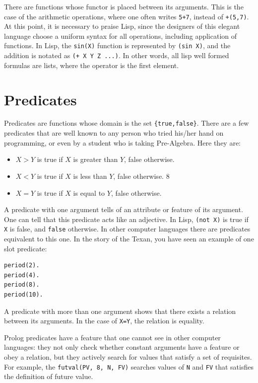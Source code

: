 \documentclass[a4paper,12pt]{book}
\begin{document}
There are functions whose functor is placed between
its arguments. This is the case of the arithmetic
operations, where one often writes \verb|5+7|, instead
of \verb|+(5,7)|. At this point, it is necessary to
praise Lisp, since the designers of this elegant language
choose a uniform syntax for all operations, including
application of functions. In Lisp, the \verb|sin(X)|
function is represented by \verb|(sin X)|, and the
addition is notated as \verb|(+ X Y Z ...)|. In other
words, all lisp well formed formulas are lists, where
the operator is the first element.

\section{Predicates}
Predicates are functions whose domain is the set
\verb|{true,false}|. There are a few predicates
that are well known to any person who tried his/her
hand on programming, or even by a student who is
taking Pre-Algebra. Here they are:
\begin{itemize}
\item $X>Y$ is true if $X$ is greater than $Y$, false otherwise.
\item $X<Y$ is true if $X$ is less than $Y$, false otherwise.
8\item $X=Y$ is true if $X$ is equal to $Y$, false otherwise.
\end{itemize}
A predicate with one argument tells of an attribute or feature
of its argument. One can tell that this predicate acts like
an adjective. In Lisp, \verb|(not X)| is true if \verb|X| is
false, and \verb|false| otherwise. In other computer languages
there are predicates equivalent to this one. In the story of
the Texan, you have seen an example of one slot predicate:
\begin{verbatim}
period(2).
period(4).
period(8).
period(10).
\end{verbatim}

A predicate with more than one argument shows that there
exists a relation between its arguments. In the case of
\verb|X=Y|, the relation is equality.

Prolog predicates have a feature that one cannot see in
other computer languages: they not only check whether
constant arguments have a feature or obey a relation,
but they actively search for values that satisfy a
set of requisites. For example, the \verb|futval(PV, 8, N, FV)|
searches values of \verb|N| and \verb|FV| that satisfies
the definition of future value.
\end{document}
